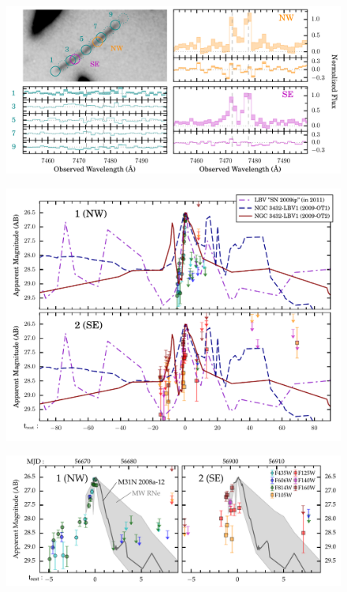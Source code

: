 \begin{figure}[tbp]
  \begin{center}
    \includegraphics[width=\textwidth]{muse_oii_sequence}
    \caption{\protect}
  \end{center}
\end{figure}

\begin{figure}[tbp]
  \begin{center}
    \includegraphics[width=\textwidth]{lbv_lightcurve_comparison}
    \caption{\protect}
  \end{center}
\end{figure}

\begin{figure}[tbp]
  \begin{center}
    \includegraphics[width=\textwidth]{recurrent_nova_lightcurve_comparison}
    \caption{\protect}
  \end{center}
\end{figure}


